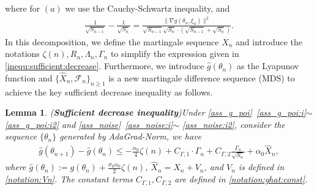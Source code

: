 \documentclass[standalone]{article}
\newtheorem{lem}{Lemma}[section]
\begin{document}
where for $(a)$ we use the Cauchy-Schwartz inequality, and 
\begin{align}\label{inequ:sn:minus:sn1}
\frac{1}{\sqrt{S_{n-1}}} - \frac{1}{\sqrt{S_{n}}} =  \frac{\|\nabla g(\theta_{n},\xi_{n})\|^{2}}{\sqrt{S_{n-1}}\sqrt{S_{n}}\cdot(\sqrt{S_{n-1}}+\sqrt{S_{n}})}.
\end{align}
In this decomposition, we define the martingale sequence $X_{n}$ and introduce the notations $\zeta(n), R_n, \Lambda_n, \Gamma_n$ to simplify the expression given in \cref{inequ:sufficient:decrease}. Furthermore, we introduce $\hat{g}(\theta_n)$ as the Lyapunov function and $\{ \hat{X}_n, \mathscr{F}_{n}\}_{n\ge 1}$ is a new martingale difference sequence (MDS) to achieve the key sufficient decrease inequality as follows. 
\begin{lem}({\bf Sufficient decrease inequality})\label{sufficient:lem}
Under \cref{ass_g_poi}~\ref{ass_g_poi:i}$\sim$\ref{ass_g_poi:i2} and  \cref{ass_noise}~\ref{ass_noise:i}$\sim$ \ref{ass_noise:i2}, consider the sequence $\{\theta_{n}\}$ generated by AdaGrad-Norm, we have 
\begin{align}
\hat{g}(\theta_{n+1}) - \hat{g}(\theta_n) \leq -\frac{\alpha_{0}}{4}\zeta(n)+C_{\Gamma, 1}\cdot \Gamma_n  + C_{\Gamma, 2}\frac{\Gamma_n}{\sqrt{S_{n}}} + \alpha_0 \hat{X}_{n},
\end{align}
where $\hat{g}(\theta_{n}):=g(\theta_{n})+ \frac{\sigma_{0}\alpha_{0}}{2}\zeta(n)$, $\hat{X}_n = X_n + V_n$, and $V_n$ is defined in \cref{notation:Vn}. The constant terms $C_{\Gamma, 1}, C_{\Gamma, 2}$ are defined in \cref{notation:ghat:const}.
\end{lem}
\end{document}
